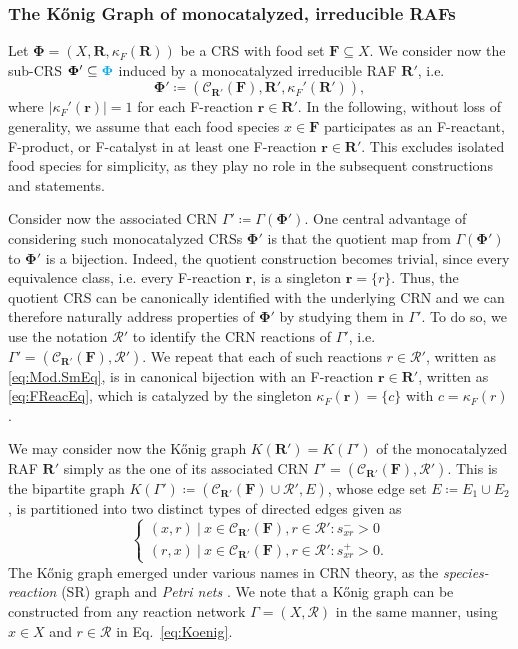 \documentclass[pdflatex]{sn-jnl}
\theoremstyle{thmstyleone}%
\theoremstyle{examplesty}%
\theoremstyle{thmstylethree}%
\newcommand{\king}{K}
\newcommand{\food}{\ensuremath{\mathbf{F}}}
\newcommand{\closure}[2]{\mathscr{C}_{#1}(#2)}
\newcommand{\CR}[0]{\mathcal{R}}
\newcommand{\FR}[0]{\mathbf{R}}
\newcommand{\fr}[0]{\mathbf{r}}
\newcommand{\RAF}[0]{\mathbf{R}'}
\newcommand{\cat}{\kappa_F}
\newcommand{\PFS}[1]{\begingroup\color{cyan}#1\endgroup}
\begin{document}
\subsubsection{The K\H{o}nig Graph of monocatalyzed, irreducible
  RAFs}\label{subsec:King}

Let $\mathbf{\Phi}=(X,\FR,\cat(\FR))$ be a CRS with food set
$\food\subseteq X$. We consider now the sub-CRS
$\mathbf{\Phi}'\subseteq \PFS{\mathbf{\Phi}}$ induced by a monocatalyzed
irreducible RAF $\RAF$, i.e.
\begin{equation}\label{eq:RAF-CRS}
  \mathbf{\Phi}' \coloneqq (\closure{\RAF}{\food}, \RAF, \cat'(\RAF)),
\end{equation}
where $|\cat'(\fr)|=1$ for each F-reaction $\fr\in \RAF$. In the following,
without loss of generality, we assume that each food species $x\in\food$
participates as an F-reactant, F-product, or F-catalyst in at least one
F-reaction $\fr\in\RAF$. This excludes isolated food species for
simplicity, as they play no role in the subsequent constructions and
statements.

Consider now the associated CRN $\Gamma'\coloneqq
\Gamma(\mathbf{\Phi}')$. One central advantage of considering such
monocatalyzed CRSs $\mathbf{\Phi}'$ is that the quotient map from
$\Gamma(\mathbf{\Phi}')$ to $\mathbf{\Phi}'$ is a bijection. Indeed, the
quotient construction becomes trivial, since every equivalence class,
i.e. every F-reaction $\fr$, is a singleton $\fr=\{r\}$. Thus, the quotient
CRS can be canonically identified with the underlying CRN and we can
therefore naturally address properties of $\mathbf{\Phi}'$ by studying them
in $\Gamma'$. To do so, we use the notation $\mathcal{R}'$ to identify the
CRN reactions of $\Gamma'$,
i.e. $\Gamma'=(\closure{\RAF}{\food},\mathcal{R}')$. We repeat that each of
such reactions $r\in \mathcal{R}'$, written as \eqref{eq:Mod.SmEq}, is in
canonical bijection with an F-reaction $\fr\in \RAF$, written as
\eqref{eq:FReacEq}, which is catalyzed by the singleton $\cat(\fr)=\{c\}$
with $c=\cat(r)$.

We may consider now the K{\H{o}}nig graph $K(\RAF)=K(\Gamma')$ of the
monocatalyzed RAF $\RAF$ simply as the one of its associated CRN
$\Gamma'=(\closure{\RAF}{\food},\mathcal{R}')$. This is the bipartite graph
$\king(\Gamma') \coloneqq (\closure{\RAF}{\food} \cup \CR', E)$, whose edge
set $E\coloneqq E_1\cup E_2$, is partitioned into two distinct types of
directed edges given as
\begin{equation}
  \begin{cases} (x,r) \ | \ x\in \closure{\RAF}{\food},
    r\in \CR': s^-_{xr}>0 \\
    (r, x) \ | \ x\in \closure{\RAF}{\food},
    r\in \CR': s^+_{xr}>0.
  \end{cases}
  \label{eq:Koenig}
\end{equation}
The K\H{o}nig graph emerged under various names in CRN theory, as the
\emph{species-reaction} (SR) graph \cite{craciun_multiple_2006} and
\emph{Petri nets} \cite{angeli_petri_2007}. We note that a K{\H{o}}nig
  graph can be constructed from any reaction network
  $\Gamma=(X,\mathcal{R})$ in the same manner, using $x\in X$ and
  $r\in\mathcal{R}$ in Eq.~\eqref{eq:Koenig}.
\end{document}
